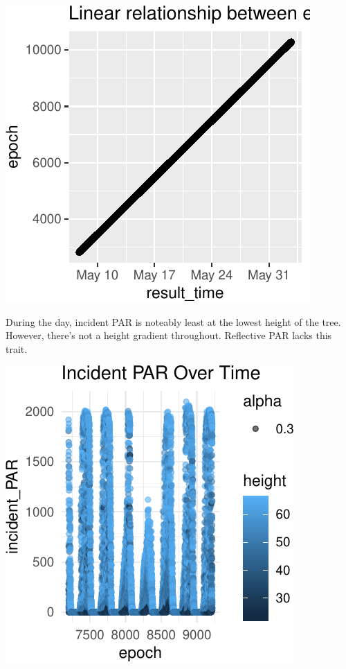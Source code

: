 \documentclass[]{article}
\begin{document}
\begin{center}\includegraphics{Project1WriteUp_files/figure-latex/unnamed-chunk-16-1} \end{center}

During the day, incident PAR is noteably least at the lowest height of
the tree. However, there's not a height gradient throughout. Reflective
PAR lacks this trait.

\begin{center}\includegraphics{Project1WriteUp_files/figure-latex/unnamed-chunk-17-1} \end{center}
\end{document}

